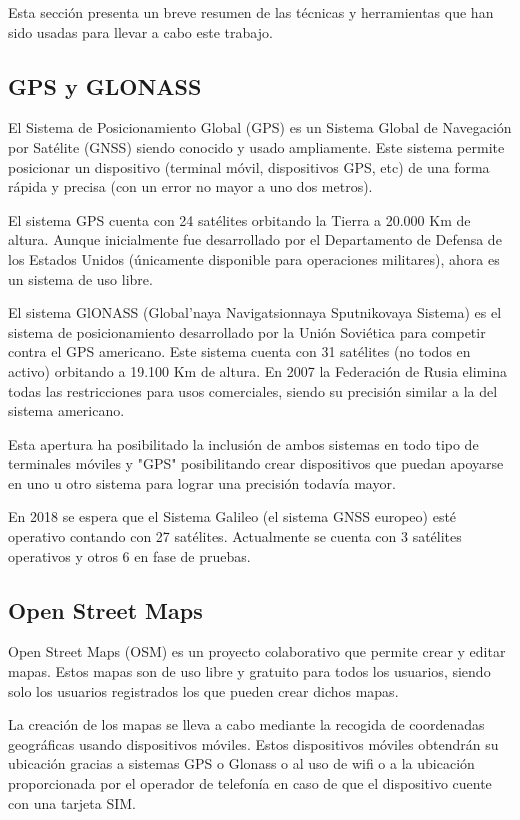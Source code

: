 
Esta sección presenta un breve resumen de las técnicas y herramientas que han sido usadas para llevar a cabo este trabajo.

\subsection{GPS y GLONASS}

El Sistema de Posicionamiento Global (GPS) es un Sistema Global de Navegación por Satélite (GNSS) siendo conocido y usado ampliamente. Este sistema permite posicionar un dispositivo (terminal móvil, dispositivos GPS, etc) de una forma rápida y precisa (con un error no mayor a uno dos metros).

El sistema GPS cuenta con 24 satélites orbitando la Tierra a 20.000 Km de altura. Aunque inicialmente fue desarrollado por el Departamento de Defensa de los Estados Unidos (únicamente disponible para operaciones militares), ahora es un sistema de uso libre.

El sistema GlONASS (Global'naya Navigatsionnaya Sputnikovaya Sistema) es el sistema de posicionamiento desarrollado por la Unión Soviética para competir contra el GPS americano. Este sistema cuenta con 31 satélites (no todos en activo) orbitando a 19.100 Km de altura. En 2007 la Federación de Rusia elimina todas las restricciones para usos comerciales, siendo su precisión similar a la del sistema americano.

Esta apertura ha posibilitado la inclusión de ambos sistemas en todo tipo de terminales móviles y "GPS" posibilitando crear dispositivos que puedan apoyarse en uno u otro sistema para lograr una precisión todavía mayor.

En 2018 se espera que el Sistema Galileo (el sistema GNSS europeo) esté operativo contando con 27 satélites. Actualmente se cuenta con 3 satélites operativos y otros 6 en fase de pruebas.


\subsection{Open Street Maps}
Open Street Maps (OSM) es un proyecto colaborativo que permite crear y editar mapas. Estos mapas son de uso libre y gratuito para todos los usuarios, siendo solo los usuarios registrados los que pueden crear dichos mapas.

La creación de los mapas se lleva a cabo mediante la recogida de coordenadas geográficas usando dispositivos móviles. Estos dispositivos móviles obtendrán su ubicación gracias a sistemas GPS o Glonass o al uso de wifi o a la ubicación proporcionada por el operador de telefonía en caso de que el dispositivo cuente con una tarjeta SIM.


